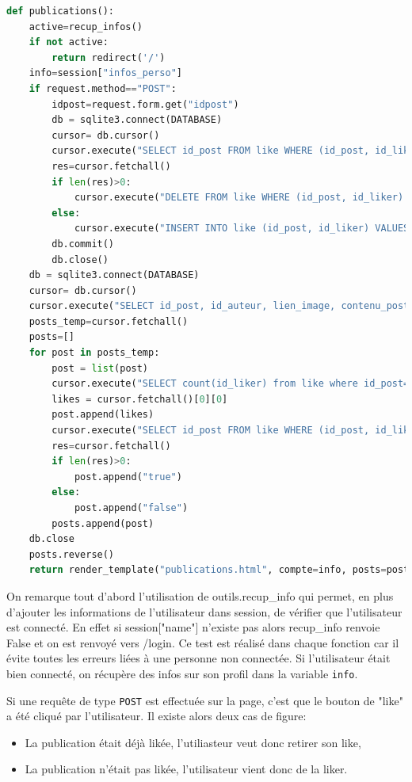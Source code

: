 \documentclass[11pt]{article}
\begin{document}
\begin{lstlisting}[language=Python, caption={Fonction Python \texttt{publications}}]
def publications():
    active=recup_infos()
    if not active:
        return redirect('/')
    info=session["infos_perso"]
    if request.method=="POST":
        idpost=request.form.get("idpost")
        db = sqlite3.connect(DATABASE)
        cursor= db.cursor()
        cursor.execute("SELECT id_post FROM like WHERE (id_post, id_liker) = (?, ?)", (idpost, session["name"]))
        res=cursor.fetchall()
        if len(res)>0:
            cursor.execute("DELETE FROM like WHERE (id_post, id_liker) = (?, ?)", (idpost, session["name"]))
        else:
            cursor.execute("INSERT INTO like (id_post, id_liker) VALUES (?, ?)", (idpost, session["name"]))
        db.commit()
        db.close()
    db = sqlite3.connect(DATABASE)
    cursor= db.cursor()
    cursor.execute("SELECT id_post, id_auteur, lien_image, contenu_post, date_post, heure_post FROM social ORDER BY date_post")
    posts_temp=cursor.fetchall()
    posts=[]
    for post in posts_temp:
        post = list(post)
        cursor.execute("SELECT count(id_liker) from like where id_post=?;",[post[0]])
        likes = cursor.fetchall()[0][0]
        post.append(likes)
        cursor.execute("SELECT id_post FROM like WHERE (id_post, id_liker) = (?, ?)", (post[0], session["name"]))
        res=cursor.fetchall()
        if len(res)>0:
            post.append("true")
        else:
            post.append("false")
        posts.append(post)
    db.close
    posts.reverse()
    return render_template("publications.html", compte=info, posts=posts)
\end{lstlisting}

On remarque tout d'abord l'utilisation de outils.recup\_info qui permet, en plus d'ajouter les informations de l'utilisateur dans session, de vérifier que l'utilisateur est connecté. En effet si session["name"] n'existe pas alors recup\_info renvoie False et on est renvoyé vers /login. Ce test est réalisé dans chaque fonction car il évite toutes les erreurs liées à une personne non connectée. Si l'utilisateur était bien connecté, on récupère des infos sur son profil dans la variable \texttt{info}.

Si une requête de type \texttt{POST} est effectuée sur la page, c'est que le bouton de "like" a été cliqué par l'utilisateur. Il existe alors deux cas de figure:
\begin{itemize}
    \item La publication était déjà likée, l'utiliasteur veut donc retirer son like,
    \item La publication n'était pas likée, l'utilisateur vient donc de la liker.
\end{itemize}
\end{document}
